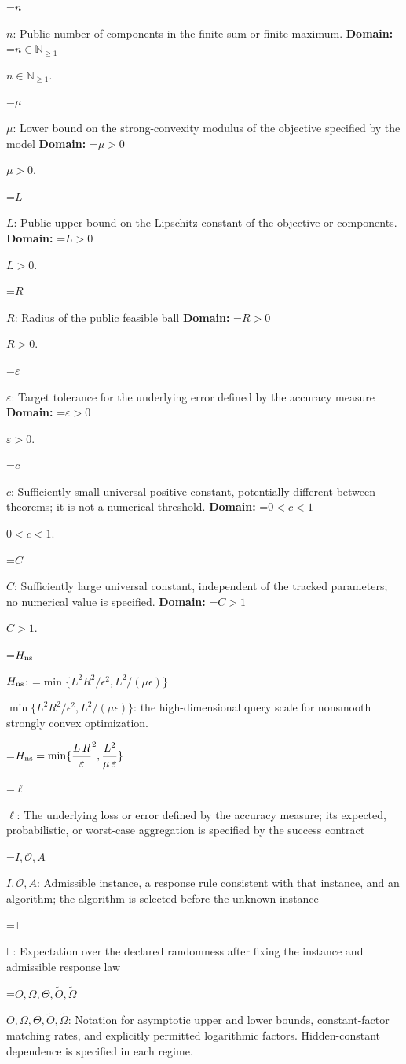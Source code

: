 \documentclass[10pt,a4paper]{article}
\newcommand{\AtlasMath}[1]{\par\begingroup\centering\setbox0=\hbox{$\displaystyle #1$}\ifdim\wd0>1.4\linewidth\typeout{ATLAS WIDE FORMULA: \the\wd0}\fi\ifdim\wd0>\linewidth\resizebox{\linewidth}{!}{\box0}\else\box0\fi\par\endgroup}
\newcommand{\AtlasInlineMath}[1]{\begingroup\setbox0=\hbox{$#1$}\ifdim\wd0>.4\linewidth\endgroup\AtlasMath{#1}\else\endgroup$#1$\fi}
\begin{document}
\AtlasInlineMath{n}: Public number of components in the finite sum or finite maximum. \textbf{Domain:} \AtlasInlineMath{n\in\mathbb{N}_{\ge1}}.

\AtlasInlineMath{\mu}: Lower bound on the strong-convexity modulus of the objective specified by the model \textbf{Domain:} \AtlasInlineMath{\mu>0}.

\AtlasInlineMath{L}: Public upper bound on the Lipschitz constant of the objective or components. \textbf{Domain:} \AtlasInlineMath{L>0}.

\AtlasInlineMath{R}: Radius of the public feasible ball \textbf{Domain:} \AtlasInlineMath{R>0}.

\AtlasInlineMath{\varepsilon}: Target tolerance for the underlying error defined by the accuracy measure \textbf{Domain:} \AtlasInlineMath{\varepsilon>0}.

\AtlasInlineMath{c}: Sufficiently small universal positive constant, potentially different between theorems; it is not a numerical threshold. \textbf{Domain:} \AtlasInlineMath{0<c<1}.

\AtlasInlineMath{C}: Sufficiently large universal constant, independent of the tracked parameters; no numerical value is specified. \textbf{Domain:} \AtlasInlineMath{C>1}.

\AtlasInlineMath{H_{\rm ns}}: \AtlasInlineMath{\min\{L^2R^2/\epsilon^2,L^2/(\mu\epsilon)\}}: the high-dimensional query scale for nonsmooth strongly convex optimization.


\AtlasMath{H_{\rm ns}=\min\{{\frac{L\,R}{\varepsilon}}^{2},\frac{{L}^{2}}{\mu\,\varepsilon}\}}


\AtlasInlineMath{\ell}: The underlying loss or error defined by the accuracy measure; its expected, probabilistic, or worst-case aggregation is specified by the success contract

\AtlasInlineMath{I,\mathcal{O},A}: Admissible instance, a response rule consistent with that instance, and an algorithm; the algorithm is selected before the unknown instance

\AtlasInlineMath{\mathbb{E}}: Expectation over the declared randomness after fixing the instance and admissible response law

\AtlasInlineMath{O,\Omega,\Theta,\widetilde{O},\widetilde\Omega}: Notation for asymptotic upper and lower bounds, constant-factor matching rates, and explicitly permitted logarithmic factors. Hidden-constant dependence is specified in each regime.
\end{document}
